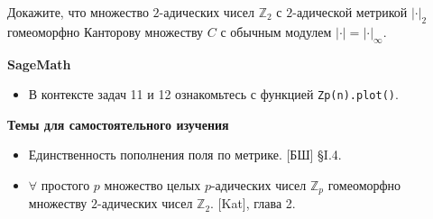 \begin{enumerate}[topsep=0pt]
    Докажите, что множество $2$-адических чисел $\mathbb{Z}_2$ с $2$-адической метрикой $|\cdot|_2$ гомеоморфно Канторову множеству $C$ с обычным модулем $|\cdot|=|\cdot|_\infty$.

\end{enumerate}

\noindent\textbf{SageMath}
\begin{itemize}[topsep=0pt]
    \item В контексте задач 11 и 12 ознакомьтесь с функцией \texttt{Zp(n).plot()}.
\end{itemize}

\noindent\textbf{Темы для самостоятельного изучения}
\begin{itemize}[topsep=0pt]
    \item Единственность пополнения поля по метрике. [БШ] \S I.4.
    \item $\forall$ простого $p$ множество целых $p$-адических чисел $\mathbb{Z}_p$ гомеоморфно множеству $2$-адических чисел $\mathbb{Z}_2$. [Kat], глава 2. %
\end{itemize}
